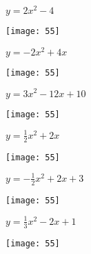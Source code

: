 \documentclass[a4paper]{oblivoir}
\begin{document}
\clearpage
\begin{minipage}{0.45\textwidth}\centering
\(y=2x^2-4\)
\par\bigskip\texttt{[image: 55]}
\end{minipage}
\begin{minipage}{0.45\textwidth}\centering
\(y=-2x^2+4x\)
\par\bigskip\texttt{[image: 55]}
\end{minipage}\bigskip\bigskip\par
\begin{minipage}{0.45\textwidth}\centering
\(y=3x^2-12x+10\)
\par\bigskip\texttt{[image: 55]}
\end{minipage}
\begin{minipage}{0.45\textwidth}\centering
\(y=\frac12x^2+2x\)
\par\bigskip\texttt{[image: 55]}
\end{minipage}\bigskip\bigskip\par
\begin{minipage}{0.45\textwidth}\centering
\(y=-\frac12x^2+2x+3\)
\par\bigskip\texttt{[image: 55]}
\end{minipage}
\begin{minipage}{0.45\textwidth}\centering
\(y=\frac13x^2-2x+1\)
\par\bigskip\texttt{[image: 55]}
\end{minipage}\bigskip\bigskip\par
\end{document}
